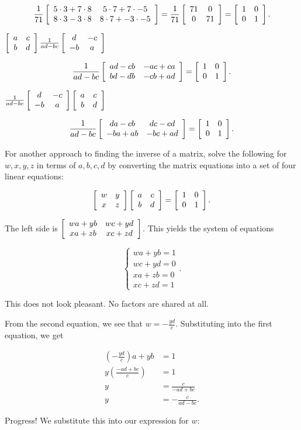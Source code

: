 \documentclass[../key.tex]{subfiles}
\begin{document}
$$\frac{1}{71}\left[\begin{array}{cc} 5 \cdot 3 + 7\cdot 8 & 5\cdot 7 + 7\cdot -5 \\ 8\cdot 3 - 3\cdot 8 & 8\cdot 7 + -3\cdot -5 \end{array}\right] = \frac{1}{71}\left[\begin{array}{cc} 71 & 0 \\ 0 & 71 \end{array}\right] = \left[\begin{array}{cc} 1 & 0 \\ 0 & 1 \end{array}\right].$$

\begin{inner_problem}
\item $\left[\begin{array}{cc} a & c \\ b & d \end{array}\right]\frac{1}{ad-bc}\left[\begin{array}{cc} d & -c \\ -b & a \end{array}\right]$
\end{inner_problem}

$$\frac{1}{ad-bc}\left[\begin{array}{cc} ad-cb & -ac+ca \\ bd-db & -cb+ad \end{array}\right]=\left[\begin{array}{cc} 1 & 0 \\ 0 & 1 \end{array}\right].$$

\begin{inner_problem}
\item $\frac{1}{ad-bc}\left[\begin{array}{cc} d & -c \\ -b & a \end{array}\right]\left[\begin{array}{cc} a & c \\ b & d \end{array}\right]$
\end{inner_problem}

$$\frac{1}{ad-bc}\left[\begin{array}{cc} da-cb & dc-cd \\ -ba+ab & -bc+ad \end{array}\right]=\left[\begin{array}{cc} 1 & 0 \\ 0 & 1 \end{array}\right].$$

\begin{outer_problem}
\item For another approach to finding the inverse of a matrix, solve the following for $w,x,y,z$ in terms of $a,b,c,d$ by converting the matrix equations into a set of four linear equations:

$$\left[\begin{array}{cc} w & y \\ x & z \end{array}\right]\left[\begin{array}{cc} a & c \\ b & d \end{array}\right]=\left[\begin{array}{cc} 1 & 0 \\ 0 & 1 \end{array}\right].$$
\end{outer_problem}

The left side is $\left[\begin{array}{cc} wa+yb & wc+yd \\ xa+zb & xc+zd \end{array}\right]$. This yields the system of equations

$$\begin{cases} wa+yb = 1 \\ wc+yd = 0 \\ xa+zb = 0 \\ xc+zd = 1 \end{cases}.$$

This does not look pleasant. No factors are shared at all.

From the second equation, we see that $w=-\frac{yd}{c}$. Substituting into the first equation, we get

\begin{align*}
\left(-\frac{yd}{c}\right)a + yb &= 1 \\
y\left(\frac{-ad+bc}{c}\right) & =1 \\
y &= \frac{c}{-ad+bc} \\
y &= -\frac{c}{ad-bc}.
\end{align*}

Progress! We substitute this into our expression for $w$:
\end{document}
